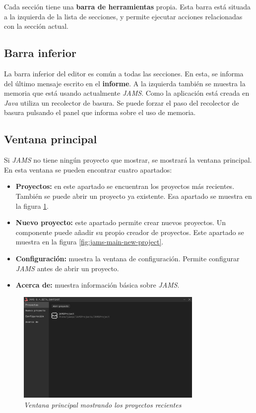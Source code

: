 Cada sección tiene una \textbf{barra de herramientas} propia.
Esta barra está situada a la izquierda de la lista de secciones, y permite
ejecutar acciones relacionadas con la sección actual.

\subsection{Barra inferior}\label{subsec:barra-inferior}

La barra inferior del editor es común a todas las secciones.
En esta, se informa del último mensaje escrito en el \textbf{informe}.
A la izquierda también se muestra la memoria que está usando actualmente
\textit{JAMS}.
Como la aplicación está creada en \textit{Java} utiliza un recolector
de basura.
Se puede forzar el paso del recolector de basura pulsando el panel que informa
sobre el uso de memoria.

\subsection{Ventana principal}\label{subsec:ventana-principal}

Si \textit{JAMS} no tiene ningún proyecto que mostrar, se mostrará la ventana
principal.
En esta ventana se pueden encontrar cuatro apartados:
\begin{itemize}
    \item \textbf{Proyectos:} en este apartado se encuentran los proyectos más
    recientes.
    También se puede abrir un proyecto ya existente.
    Esa apartado se muestra en la figura \ref{fig:jams-main-projects}.
    \item \textbf{Nuevo proyecto:} este apartado permite crear nuevos proyectos.
    Un componente puede añadir su propio creador de proyectos.
    Este apartado se muestra en la figura \ref{fig:jams-main-new-project}.
    \item \textbf{Configuración:} muestra la ventana de configuración.
    Permite configurar \textit{JAMS} antes de abrir un proyecto.
    \item \textbf{Acerca de:} muestra información básica sobre \textit{JAMS}.
\end{itemize}

\begin{figure}[H]
    \centering
    \includegraphics[width=0.8\textwidth]{images/base/jams-main-projects}
    \caption{\textit{Ventana principal mostrando los proyectos recientes}}
    \label{fig:jams-main-projects}
\end{figure}

